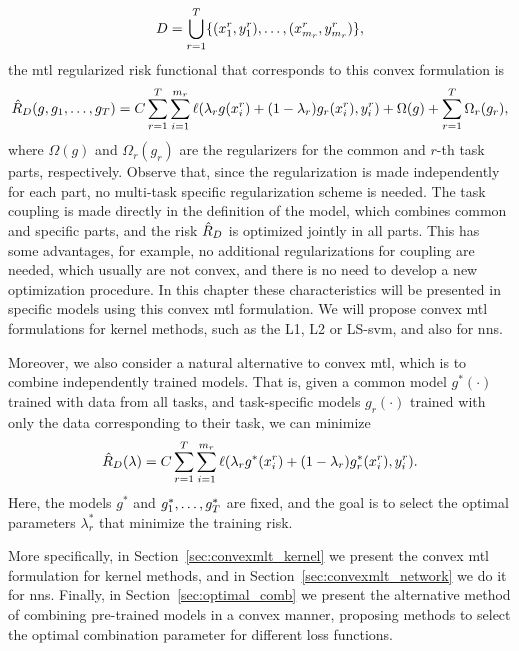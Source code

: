 $$D = \bigcup_{r=1}^T \{(x_1^r, y_1^r), \ldots, (x_{m_r}^r, y_{m_r}^r)\},$$
the \acrshort{mtl} regularized risk functional that corresponds to this convex formulation is 
\begin{equation}
    \nonumber
    \hat{R}_{D} ({g, g_1, \ldots, g_T}) = C\sum_{r=1}^{T} \sum_{i=1}^{m_r} \ell(\lambda_r g(x_i^r) + (1 - \lambda_r) g_r(x_i^r), y_i^r) + \Omega(g) + \sum_{r=1}^T \Omega_r(g_r) ,
\end{equation}
where $\Omega(g)$ and $\Omega_r(g_r)$ are the regularizers for the common and $r$-th task parts, respectively. Observe that, since the regularization is made independently for each part, no multi-task specific regularization scheme is needed. The task coupling is made directly in the definition of the model, which combines common and specific parts, and the risk $\hat{R}_{D}$ is optimized jointly in all parts.
This has some advantages, for example, no additional regularizations for coupling are needed, which usually are not convex, and there is no need to develop a new optimization procedure. In this chapter these characteristics will be presented in specific models using this convex \acrshort{mtl} formulation. We will propose convex \acrshort{mtl} formulations for kernel methods, such as the L1, L2 or LS-\acrfull{svm}, and also for \acrfull{nns}.
%

Moreover, we also consider a natural alternative to convex \acrshort{mtl}, which is to combine independently trained models. That is, given a common model $g^*(\cdot)$ trained with data from all tasks, and task-specific models $g_r(\cdot)$ trained with only the data corresponding to their task, we can minimize 
\begin{equation}
    \nonumber
    \hat{R}_{D} (\lambda) = C\sum_{r=1}^{T} \sum_{i=1}^{m_r} \ell(\lambda_r g^*(x_i^r) + (1 - \lambda_r) g^*_r(x_i^r), y_i^r)  .
\end{equation}
Here, the models $g^*$ and $g^*_1, \ldots, g^*_T$ are fixed, and the goal is to select the optimal parameters $\lambda^*_r$ that minimize the training risk.

%
More specifically, in Section~\ref{sec:convexmlt_kernel} we present the convex \acrshort{mtl} formulation for kernel methods, and in Section~\ref{sec:convexmlt_network} we do it for \acrshort{nns}.
Finally, in Section~\ref{sec:optimal_comb} we present the alternative method of combining pre-trained models in a convex manner, proposing methods to select the optimal combination parameter for different loss functions.
%





